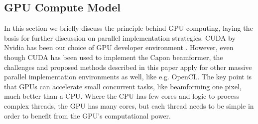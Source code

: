 \documentclass[12pt,journal,onecolumn]{IEEEtran}
\begin{document}



\subsection{GPU Compute Model}



In this section we briefly discuss the principle behind GPU computing, laying the basis for further discussion on parallel implementation strategies. CUDA by Nvidia has been our choice of GPU developer environment \cite{Nvidia2011}. However, even though CUDA has been used to implement the Capon beamformer, the challenges and proposed methods described in this paper apply for other massive parallel implementation environments as well, like e.g. OpenCL. The key point is that GPUs can accelerate small concurrent tasks, like beamforming one pixel, much better than a CPU. Where the CPU has few cores and logic to process complex threads, the GPU has many cores, but each thread needs to be simple in order to benefit from the GPU's computational power. 
\end{document}
